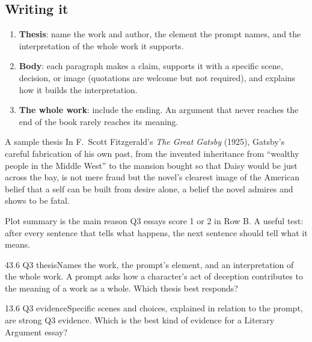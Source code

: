 \documentclass[11pt]{article}
\begin{document}
\subsection{Writing it}
\begin{enumerate}[leftmargin=1.6em]
\item \textbf{Thesis}: name the work and author, the element the prompt names, and the interpretation of the whole work it supports.
\item \textbf{Body}: each paragraph makes a claim, supports it with a specific scene, decision, or image (quotations are welcome but not required), and explains how it builds the interpretation.
\item \textbf{The whole work}: include the ending. An argument that never reaches the end of the book rarely reaches its meaning.
\end{enumerate}

\begin{study}{A sample thesis}
In F.~Scott Fitzgerald's \emph{The Great Gatsby} (1925), Gatsby's careful fabrication of his own past, from the invented inheritance from ``wealthy people in the Middle West'' to the mansion bought so that Daisy would be just across the bay, is not mere fraud but the novel's clearest image of the American belief that a self can be built from desire alone, a belief the novel admires and shows to be fatal.
\end{study}

\begin{trap}
Plot summary is the main reason Q3 essays score 1 or 2 in Row B. A useful test: after every sentence that tells what happens, the next sentence should tell what it means.
\end{trap}

\begin{q}{4}{3.6 Q3 thesis}{Names the work, the prompt's element, and an interpretation of the whole work.}
A prompt asks how a character's act of deception contributes to the meaning of a work as a whole. Which thesis best responds?
\end{q}

\begin{q}{1}{3.6 Q3 evidence}{Specific scenes and choices, explained in relation to the prompt, are strong Q3 evidence.}
Which is the best kind of evidence for a Literary Argument essay?
\end{q}

\makekey
\end{document}
